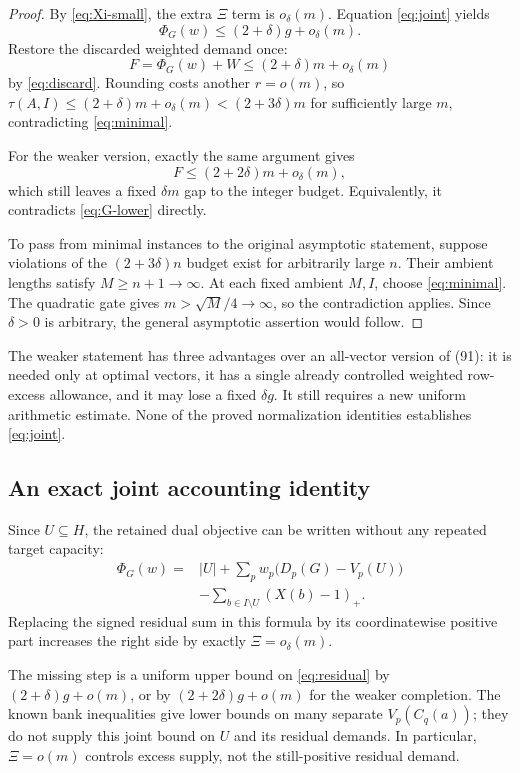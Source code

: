\documentclass[11pt,a4paper]{article}
\theoremstyle{remark}
\newcommand{\pos}[1]{(#1)_+}
\begin{document}
\begin{proof}
By \eqref{eq:Xi-small}, the extra \(\Xi\) term is \(o_\delta(m)\).
Equation \eqref{eq:joint} yields
\[
 \Phi_G(w)\le(2+\delta)g+o_\delta(m).
\]
Restore the discarded weighted demand once:
\[
 F=\Phi_G(w)+W
 \le(2+\delta)m+o_\delta(m)
\]
by \eqref{eq:discard}. Rounding costs another \(r=o(m)\), so
\(\tau(A,I)\le(2+\delta)m+o_\delta(m)<(2+3\delta)m\)
for sufficiently large \(m\), contradicting \eqref{eq:minimal}.

For the weaker version, exactly the same argument gives
\[
 F\le(2+2\delta)m+o_\delta(m),
\]
which still leaves a fixed \(\delta m\) gap to the integer budget.
Equivalently, it contradicts \eqref{eq:G-lower} directly.

To pass from minimal instances to the original asymptotic
statement, suppose violations of the \((2+3\delta)n\) budget
exist for arbitrarily large \(n\). Their ambient lengths satisfy
\(M\ge n+1\to\infty\). At each fixed ambient \(M,I\), choose
\eqref{eq:minimal}. The quadratic gate gives
\(m>\sqrt M/4\to\infty\), so the contradiction applies.
Since \(\delta>0\) is arbitrary, the general asymptotic assertion
would follow.
\end{proof}

The weaker statement has three advantages over an all-vector
version of (91): it is needed only at optimal vectors, it has a
single already controlled weighted row-excess allowance, and it
may lose a fixed \(\delta g\). It still requires a new uniform
arithmetic estimate. None of the proved normalization identities
establishes \eqref{eq:joint}.

\subsection{An exact joint accounting identity}

Since \(U\subseteq H\), the retained dual objective can be written
without any repeated target capacity:
\begin{equation}
\begin{split}
 \Phi_G(w)
  ={}& |U|+\sum_p w_p\bigl(D_p(G)-V_p(U)\bigr)\\
    &-\sum_{b\in I\setminus U}\pos{X(b)-1}.
\end{split}
\label{eq:residual}
\end{equation}
Replacing the signed residual sum in this formula by its
coordinatewise positive part increases the right side by exactly
\(\Xi=o_\delta(m)\).

The missing step is a uniform upper bound on
\eqref{eq:residual} by \((2+\delta)g+o(m)\), or by
\((2+2\delta)g+o(m)\) for the weaker completion. The known bank
inequalities give lower bounds on many separate \(V_p(C_q(a))\);
they do not supply this joint bound on \(U\) and its residual
demands. In particular, \(\Xi=o(m)\) controls excess supply,
not the still-positive residual demand.
\end{document}
